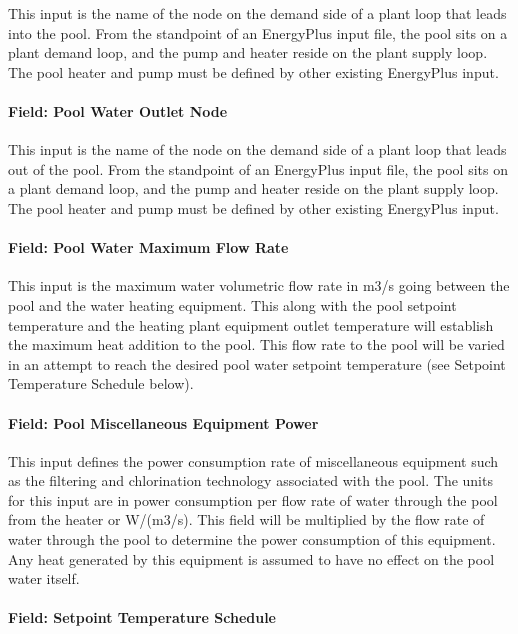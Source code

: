 This input is the name of the node on the demand side of a plant loop that leads into the pool. From the standpoint of an EnergyPlus input file, the pool sits on a plant demand loop, and the pump and heater reside on the plant supply loop. The pool heater and pump must be defined by other existing EnergyPlus input.

\paragraph{Field: Pool Water Outlet Node}\label{field-pool-water-outlet-node}

This input is the name of the node on the demand side of a plant loop that leads out of the pool. From the standpoint of an EnergyPlus input file, the pool sits on a plant demand loop, and the pump and heater reside on the plant supply loop. The pool heater and pump must be defined by other existing EnergyPlus input.

\paragraph{Field: Pool Water Maximum Flow Rate}\label{field-pool-water-maximum-flow-rate}

This input is the maximum water volumetric flow rate in m3/s going between the pool and the water heating equipment. This along with the pool setpoint temperature and the heating plant equipment outlet temperature will establish the maximum heat addition to the pool. This flow rate to the pool will be varied in an attempt to reach the desired pool water setpoint temperature (see Setpoint Temperature Schedule below).

\paragraph{Field: Pool Miscellaneous Equipment Power}\label{field-pool-miscellaneous-equipment-power}

This input defines the power consumption rate of miscellaneous equipment such as the filtering and chlorination technology associated with the pool. The units for this input are in power consumption per flow rate of water through the pool from the heater or W/(m3/s). This field will be multiplied by the flow rate of water through the pool to determine the power consumption of this equipment. Any heat generated by this equipment is assumed to have no effect on the pool water itself.

\paragraph{Field: Setpoint Temperature Schedule}\label{field-setpoint-temperature-schedule}

